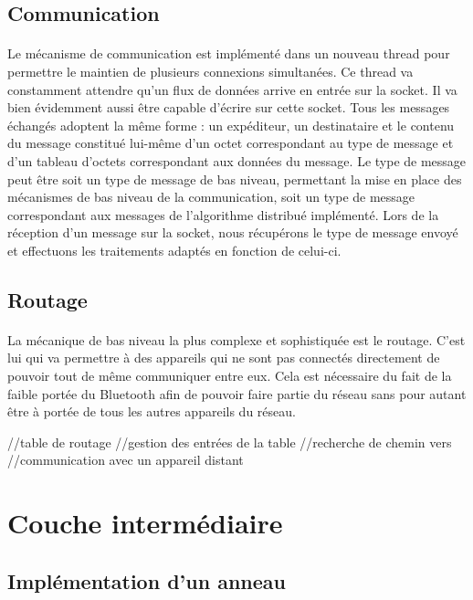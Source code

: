 \documentclass[a4paper,10pt]{report}
\begin{document}
    \subsection{Communication}
    \paragraph{}
    Le mécanisme de communication est implémenté dans un nouveau thread pour permettre le maintien de plusieurs connexions simultanées. Ce thread va constamment attendre qu'un flux de données arrive en entrée sur la socket. Il va bien évidemment aussi être capable d'écrire sur cette socket.
    Tous les messages échangés adoptent la même forme : un expéditeur, un destinataire et le contenu du message constitué lui-même d'un octet correspondant au type de message et d'un tableau d'octets correspondant aux données du message. Le type de message peut être soit un type de message de bas niveau, permettant la mise en place des mécanismes de bas niveau de la communication, soit un type de message correspondant aux messages de l'algorithme distribué implémenté.
    Lors de la réception d'un message sur la socket, nous récupérons le type de message envoyé et effectuons les traitements adaptés en fonction de celui-ci.
    
    \subsection{Routage}
    \paragraph{}
    La mécanique de bas niveau la plus complexe et sophistiquée est le routage. C'est lui qui va permettre à des appareils qui ne sont pas connectés directement de pouvoir tout de même communiquer entre eux. Cela est nécessaire du fait de la faible portée du Bluetooth afin de pouvoir faire partie du réseau sans pour autant être à portée de tous les autres appareils du réseau.
    
    //table de routage
    //gestion des entrées de la table
    //recherche de chemin vers
    //communication avec un appareil distant
  
  \section{Couche intermédiaire}
    \subsection{Implémentation d'un anneau}
\end{document}
